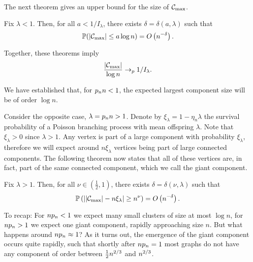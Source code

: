 The next theorem gives an upper bound for the size of $\mathcal{C}_{\max}$.
\begin{theorem}
	Fix $\lambda < 1$. 
	Then, for all $a < 1/I_{\lambda}$, 
	there exists $\delta = \delta(a, \lambda)$ such that
	\begin{equation}
	\mathbb{P}( |\mathcal{C}_{\max}| \leq a \log n ) = O\left(n^{-\delta}\right).
	\end{equation}
\end{theorem}

Together, these theorems imply
\begin{equation}
	\frac{|\mathcal{C}_{\max}|}{\log n} \rightarrow_p 1/I_{\lambda}.
\end{equation}

We have established that, for $p_n n < 1$, the expected largest component size will be of order $\log n$.

Consider the opposite case, $\lambda = p_n n > 1$. 
Denote by $\xi_\lambda = 1 - \eta_n\lambda$ the survival probability of a Poisson branching process with mean offspring $\lambda$.
Note that $\xi_\lambda > 0$ since $\lambda > 1$.
Any vertex is part of a large component with probability $\xi_\lambda$, 
therefore we will expect around $n \xi_\lambda$ vertices being part of large connected components.
The following theorem now states that all of these vertices are, in fact, part of the same connected component, which we call the giant component.
\begin{theorem}
	Fix $\lambda>1$.
	Then, for all $\nu \in (\frac{1}{2}, 1)$, there exists $\delta = \delta(\nu, \lambda)$ such that
	\begin{equation}
		\mathbb{P}\left( \left| |\mathcal{C}_{\max}| - n \xi_\lambda \right| \geq n^{\nu}\right) = O\left(n^{-\delta}\right).
	\end{equation}
\end{theorem}


To recap: For $n p_n < 1$ we expect many small clusters of size at most $\log n$,
for $n p_n > 1$ we expect one giant component, rapidly approaching size $n$.
But what happens around $n p_n \approx 1$?
As it turns out, the emergence of the giant component occurs quite rapidly,
such that shortly after $n p_n = 1$ most graphs do not have any component of order between $\frac{1}{2}n^{2 / 3}$ and $n^{2 / 3}$.

